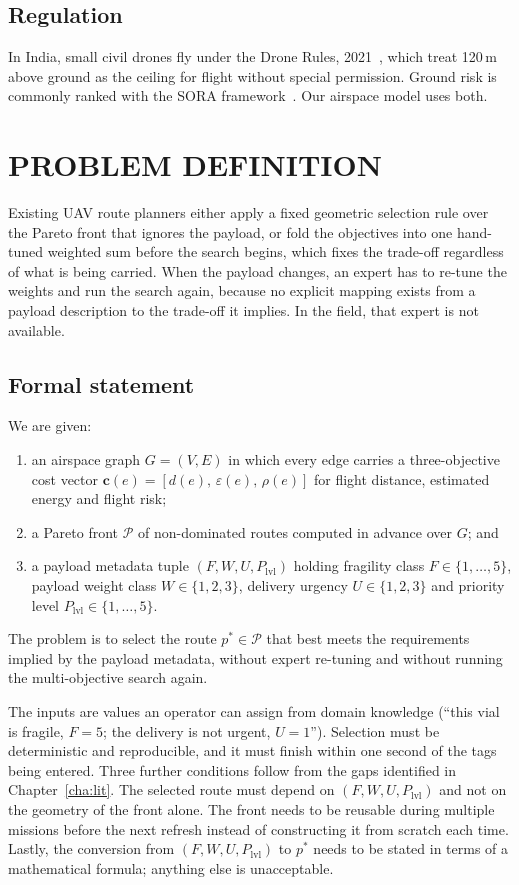 \subsection{Regulation}

In India, small civil drones fly under the Drone Rules, 2021~\cite{r21}, which treat
120\,m above ground as the ceiling for flight without special permission. Ground risk is
commonly ranked with the SORA framework~\cite{r22}. Our airspace model uses both.

\section{PROBLEM DEFINITION}\label{sec:problem}

Existing UAV route planners either apply a fixed geometric selection rule over the
Pareto front that ignores the payload, or fold the objectives into one hand-tuned
weighted sum before the search begins, which fixes the trade-off regardless of what is
being carried. When the payload changes, an expert has to re-tune the weights and run the search again,
because no explicit mapping exists from a payload description to the trade-off it
implies. In the field, that expert is not available.

\newpage
\subsection{Formal statement}

We are given:
\begin{enumerate}
  \item an airspace graph $G = (V, E)$ in which every edge carries a three-objective cost
  vector $\mathbf{c}(e) = [d(e),\, \varepsilon(e),\, \rho(e)]$ for flight distance,
  estimated energy and flight risk;
  \item a Pareto front $\mathcal{P}$ of non-dominated routes computed in advance over
  $G$; and
  \item a payload metadata tuple $(F, W, U, P_\mathrm{lvl})$ holding fragility class
  $F \in \{1,\ldots,5\}$, payload weight class $W \in \{1,2,3\}$, delivery urgency
  $U \in \{1,2,3\}$ and priority level $P_\mathrm{lvl} \in \{1,\ldots,5\}$.
\end{enumerate}
The problem is to select the route $p^* \in \mathcal{P}$ that best meets the
requirements implied by the payload metadata, without expert re-tuning and without
running the multi-objective search again.

The inputs are values an operator can assign from domain knowledge (``this vial is
fragile, $F = 5$; the delivery is not urgent, $U = 1$''). Selection must be
deterministic and reproducible, and it must finish within one second of the tags being
entered. Three further conditions follow from the gaps identified in
Chapter~\ref{cha:lit}. The selected route must depend on $(F, W, U, P_\mathrm{lvl})$ and
not on the geometry of the front alone. The front needs to be reusable during multiple
missions before the next refresh instead of constructing it from scratch each time.
Lastly, the conversion from $(F, W, U, P_\mathrm{lvl})$ to $p^*$ needs to be stated in
terms of a mathematical formula; anything else is unacceptable.

